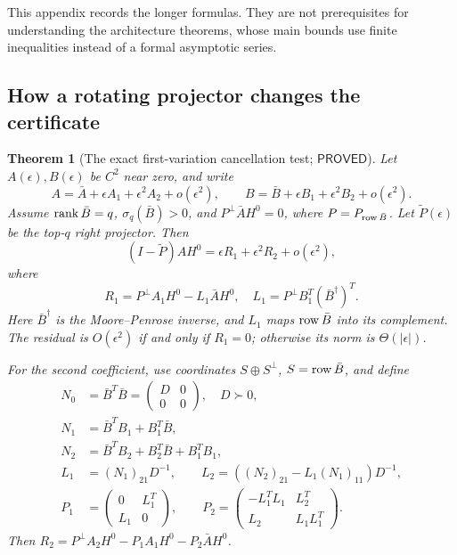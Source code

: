 \documentclass[12pt,a4paper]{article}
\theoremstyle{readable}
\newtheorem{theorem}{Theorem}[section]
\theoremstyle{definition}\newtheorem{example}[theorem]{Example}
\newcommand{\PP}{\mathsf{PROVED}}\newcommand{\FF}{\mathsf{FALSE}}
\begin{document}
This appendix records the longer formulas. They are not prerequisites for understanding the architecture theorems, whose main bounds use finite inequalities instead of a formal asymptotic series.

\subsection{How a rotating projector changes the certificate}
\begin{theorem}[The exact first-variation cancellation test; \(\PP\)]\label{thm:variation}
Let \(A(\epsilon),B(\epsilon)\) be \(C^2\) near zero, and write
\[
A=\bar A+\epsilon A_1+\epsilon^2 A_2+o(\epsilon^2),\qquad
B=\bar B+\epsilon B_1+\epsilon^2 B_2+o(\epsilon^2).
\]
Assume \(\operatorname{rank}\bar B=q\), \(\sigma_q(\bar B)>0\), and
\(P^\perp\bar A H^0=0\), where \(P=P_{\operatorname{row}\bar B}\).
Let \(\widetilde P(\epsilon)\) be the top-\(q\) right projector. Then
\[
(I-\widetilde P)AH^0=\epsilon R_1+\epsilon^2R_2+o(\epsilon^2),
\]
where
\[
R_1=P^\perp A_1H^0-L_1\bar A H^0,
\quad L_1=P^\perp B_1^T(\bar B^\dagger)^T.
\]
Here \(\bar B^\dagger\) is the Moore--Penrose inverse, and \(L_1\) maps \(\operatorname{row}\bar B\) into its complement. The residual is \(O(\epsilon^2)\) if and only if \(R_1=0\); otherwise its norm is \(\Theta(|\epsilon|)\).

For the second coefficient, use coordinates \(S\oplus S^\perp\), \(S=\operatorname{row}\bar B\), and define
\begin{align*}
N_0&=\bar B^T\bar B=\begin{pmatrix}D&0\\0&0\end{pmatrix},\quad D\succ0,\\
N_1&=\bar B^TB_1+B_1^T\bar B,\\
N_2&=\bar B^TB_2+B_2^T\bar B+B_1^TB_1,\\
L_1&=(N_1)_{21}D^{-1},\qquad
L_2=((N_2)_{21}-L_1(N_1)_{11})D^{-1},\\
P_1&=\begin{pmatrix}0&L_1^T\\L_1&0\end{pmatrix},\qquad
P_2=\begin{pmatrix}-L_1^TL_1&L_2^T\\L_2&L_1L_1^T\end{pmatrix}.
\end{align*}
Then \(R_2=P^\perp A_2H^0-P_1A_1H^0-P_2\bar A H^0\).
\end{theorem}
\end{document}

